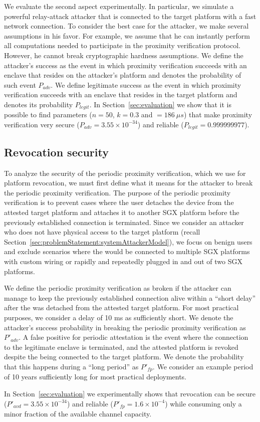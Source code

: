We evaluate the second aspect experimentally. In particular, we simulate a powerful relay-attack attacker that is connected to the target platform with a fast network connection. To consider the best case for the attacker, we make several assumptions in his favor. For example, we assume that he can instantly perform all computations needed to participate in the proximity verification protocol. However, he cannot break cryptographic hardness assumptions. We define the attacker's success as the event in which proximity verification succeeds with an enclave that resides on the attacker's platform and denotes the probability of such event $P_{adv}$. We define legitimate success as the event in which proximity verification succeeds with an enclave that resides in the target platform and denotes its probability $P_{legit}$. In Section~\ref{sec:evaluation} we show that it is possible to find parameters ($n=50$, $k=0.3$ and \connect$=186\ \mu s$) that make proximity verification very secure ($P_{adv}=3.55\times 10^{-34}$) and reliable ($P_{legit}=0.999999977$).




\subsection{Revocation security}
To analyze the security of the periodic proximity verification, which we use for platform revocation, we must first define what it means for the attacker to break the periodic proximity verification. The purpose of the periodic proximity verification is to prevent cases where the user detaches the \device device from the attested target platform and attaches it to another SGX platform before the previously established connection is terminated. Since we consider an attacker who does not have physical access to the target platform (recall Section~\ref{sec:problemStatement:systemAttackerModel}), we focus on benign users and exclude scenarios where the \device would be connected to multiple SGX platforms with custom wiring or rapidly and repeatedly plugged in and out of two SGX platforms.



We define the periodic proximity verification as broken if the attacker can manage to keep the previously established connection alive within a ``short delay'' after the \device was detached from the attested target platform. For most practical purposes, we consider a delay of 10 ms as sufficiently short. We denote the attacker's success probability in breaking the periodic proximity verification as $P'_{adv}$.
%
A false positive for periodic attestation is the event where the connection to the legitimate enclave is terminated, and the attested platform is revoked despite the \device being connected to the target platform. We denote the probability that this happens during a ``long period'' as $P'_{fp}$. We consider an example period of 10 years sufficiently long for most practical deployments.

In Section~\ref{sec:evaluation} we experimentally shows that revocation can be secure ($P'_{avd}=3.55\times10^{-34}$) and reliable
($P'_{fp}=1.6\times10^{-4}$) while consuming only a minor fraction of the available channel capacity.
